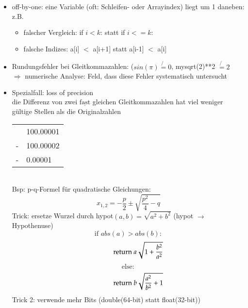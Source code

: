 \begin{itemize}
            \begin{itemize}
            \item off-by-one: eine Variable (oft: Schleifen- oder Arrayindex) liegt um 1 daneben: z.B.
            \begin{itemize}
            \item falscher Vergleich: if $i<k$: statt if $i <= k$:
            \item falsche Indizes: a[i] $<$ a[i+1] statt a[i-1] $<$ a[i]
            \end{itemize}
            \item Rundungsfehler bei Gleitkommazahlen: ($sin(\pi)\not{=} 0$, mysqrt(2)**2 $\not{=} 2$\\
            $\Rightarrow$ numerische Analyse: Feld, dass diese Fehler systematisch untersucht
            \item Spezialfall: loss of precision \\
            die Differenz von zwei $\underline{\text{fast}}$ gleichen Gleitkommazahlen hat viel weniger gültige Stellen als die Originalzahlen \\
            \begin{tabular}{L{0.5cm} R{2cm}}
            & 100.00001 \\
            - & 100.00002 \\ \hline
            - & 0.00001 \\
            \end{tabular}\\

            Bsp: p-q-Formel für quadratische Gleichungen:
            \[x_{1,2} = -\frac{p}{2} \pm \sqrt{\frac{p^2}{4} - q} \]
            Trick: ersetze Wurzel durch hypot$(a,b) = \sqrt{a^2 + b^2}$ \hspace*{1cm}(hypot $\rightarrow$ Hypothenuse)\\
            \[ \text{if } abs(a) > abs(b):\]
            \[\hspace*{1cm}\text{return } a \sqrt{1 + \frac{b^2}{a^2}}\]
            \[ \text{else}:\]
            \[\hspace*{1cm}\text{return } b \sqrt{\frac{a^2}{b^2} + 1} \]
            Trick 2: verwende mehr Bits (double(64-bit) statt float(32-bit)) \\


\end{itemize}
\end{itemize}
